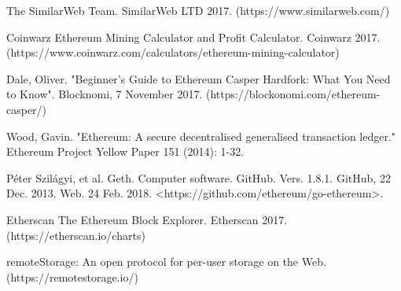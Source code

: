 \documentclass[10pt, conference, compsocconf]{IEEEtran}
\begin{document}
\begin{thebibliography}{1}
 The SimilarWeb Team. SimilarWeb LTD 2017. (https://www.similarweb.com/)

Coinwarz Ethereum Mining Calculator and Profit Calculator. Coinwarz 2017. (https://www.coinwarz.com/calculators/ethereum-mining-calculator)

Dale, Oliver. "Beginner's Guide to Ethereum Casper Hardfork: What You Need to Know". Blocknomi, 7 November 2017. (https://blockonomi.com/ethereum-casper/)

Wood, Gavin. "Ethereum: A secure decentralised generalised transaction ledger." Ethereum Project Yellow Paper 151 (2014): 1-32.

Péter Szilágyi, et al. Geth. Computer software. GitHub. Vers. 1.8.1. GitHub, 22 Dec. 2013. Web. 24 Feb. 2018. <https://github.com/ethereum/go-ethereum>. 

Etherscan The Ethereum Block Explorer. Etherscan 2017. (https://etherscan.io/charts)

 remoteStorage: An open protocol for per-user storage on the Web. (https://remotestorage.io/)
\end{thebibliography}

\addtolength{\textheight}{-7cm}
\balance


\end{document}
